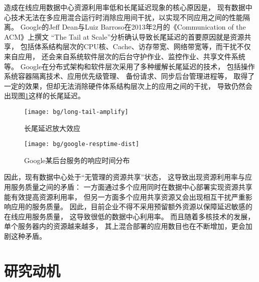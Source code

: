 造成在线应用数据中心资源利用率低和长尾延迟现象的核心原因是，
现有数据中心技术无法在多应用混合运行时消除应用间干扰，以实现不同应用之间的性能隔离。
Google的Jeff Dean与Luiz Barroso在2013年2月的《Communication of the ACM》上撰文
``The Tail at Scale''\cite{dean_tail_2013}分析确认导致长尾延迟的首要原因就是资源共享，
包括体系结构层次的CPU核、Cache、访存带宽、网络带宽等，而干扰不仅来自应用，
还会来自系统软件层次的后台守护作业、监控作业、共享文件系统等。
Google在分布式架构和软件层次采用了多种缓解长尾延迟的技术，
包括操作系统容器隔离技术\cite{cgroup}、应用优先级管理\cite{Reiss_googletrace_2012}、
备份请求\cite{dean_achieving_2012}、同步后台管理进程\cite{dean_achieving_2012}等，
取得了一定的效果，但却无法消除硬件体系结构层次上的应用之间的干扰，
导致仍然会出现图\ref{fig:google-resptime-dist}这样的长尾延迟。

\begin{figure}
\begin{minipage}{0.52\textwidth}
  \centering
  \texttt{[image: bg/long-tail-amplify]}
  \caption[长尾延迟放大效应]{长尾延迟放大效应\cite{dean_tail_2013}}
  \label{fig:long-tail-amplify}
\end{minipage}
\begin{minipage}{0.44\textwidth}
  \centering
  \texttt{[image: bg/google-resptime-dist]}
  \caption[Google某后台服务的响应时间分布]{Google某后台服务的响应时间分布\cite{Krushevskaja:2013}}
  \label{fig:google-resptime-dist}
\end{minipage}\hfill
\end{figure}

因此，现有数据中心处于``无管理的资源共享''状态，
这导致出现资源利用率与应用服务质量之间的矛盾：
一方面通过多个应用同时在数据中心部署实现资源共享能有效提高资源利用率，
但另一方面多个应用共享资源又会出现相互干扰严重影响应用的服务质量。
因此，目前企业不得不采用预留额外资源以保障延迟敏感的在线应用服务质量，
这导致很低的数据中心利用率。
而且随着多核技术的发展，单个服务器内的资源越来越多，
其上混合部署的应用数目也在不断增加，更会加剧这种矛盾。


\section{研究动机}

